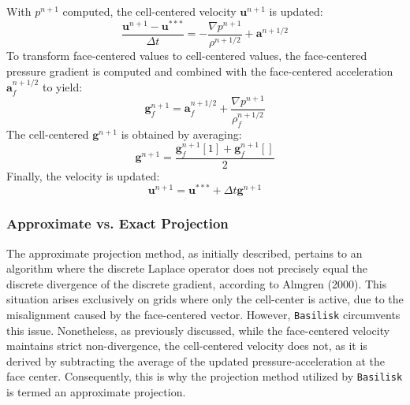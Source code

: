 With $p^{n+1}$ computed, the cell-centered velocity $\mathbf{u}^{n+1}$ is updated:  
\begin{equation}
    \frac{\mathbf{u}^{n+1} - \mathbf{u}^{***}}{\Delta t} = -\frac{\nabla
    p^{n+1}}{\rho^{n+1/2}} + \mathbf{a}^{n+1/2}
\end{equation}  
To transform face-centered values to cell-centered values, the face-centered pressure gradient is computed and combined with the face-centered acceleration $\mathbf{a}_f^{n+1/2}$ to yield:  
\begin{equation}
    \mathbf{g}_f^{n+1} = \mathbf{a}_f^{n+1/2} + \frac{\nabla p^{n+1}}{\rho_f^{n+1/2}}
\end{equation}  
The cell-centered $\mathbf{g}^{n+1}$ is obtained by averaging:  
\begin{equation}
    \mathbf{g}^{n+1} = \frac{\mathbf{g}_f^{n+1}[1] + \mathbf{g}_f^{n+1}[]}{2}
\end{equation}  
Finally, the velocity is updated:  
\begin{equation}
    \mathbf{u}^{n+1} = \mathbf{u}^{***} + \Delta t \mathbf{g}^{n+1}
\end{equation}  

\subsubsection{Approximate vs. Exact Projection}  
The approximate projection method, as initially described, pertains to an algorithm where the discrete Laplace operator does not precisely equal the discrete divergence of the discrete gradient, according to Almgren (2000)\cite{2000_Almgren}. This situation arises exclusively on grids where only the cell-center is active, due to the misalignment caused by the face-centered vector. However, \texttt{Basilisk} circumvents this issue. Nonetheless, as previously discussed, while the face-centered velocity  maintains strict non-divergence, the cell-centered velocity  does not, as it is derived by subtracting the average of the updated pressure-acceleration at the face center. Consequently, this is why the projection method utilized by \texttt{Basilisk} is termed an approximate projection.

\printbibliography

